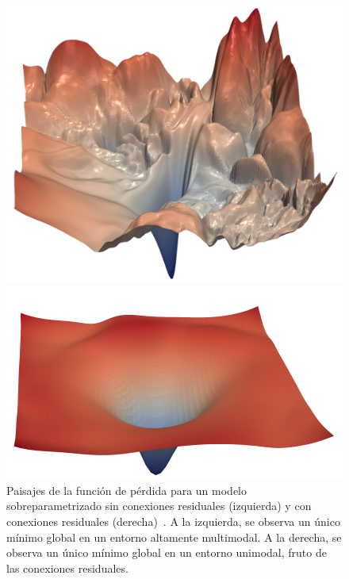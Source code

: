 \begin{figure}[h!]
    \centering
    \begin{minipage}{0.49\textwidth}
        \centering
        \includegraphics[width=\linewidth]{img/experiments/landscapemultimodal.png}
    \end{minipage}
    \hfill
    \begin{minipage}{0.49\textwidth}
        \centering
        \includegraphics[width=\linewidth]{img/experiments/landscapeunimodal.png}
    \end{minipage}
    \caption[Paisajes de la función de pérdida para distintos modelos sobreparametrizados~\cite{Li2018}.]{Paisajes de la función de pérdida para un modelo sobreparametrizado sin conexiones residuales (izquierda) y con conexiones residuales (derecha)~\cite{Li2018}. A la izquierda, se observa un único mínimo global en un entorno altamente multimodal. A la derecha, se observa un único mínimo global en un entorno unimodal, fruto de las conexiones residuales.}\label{fig:landscapes}
\end{figure} 

